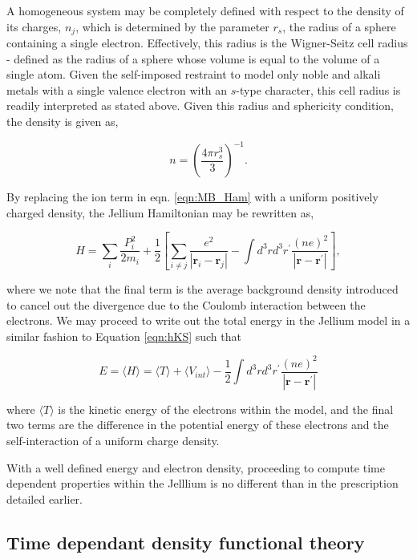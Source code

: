 A homogeneous system may be completely defined with respect to the density of its charges, $n_j$, which is determined by the parameter $r_{s}$, the radius of a sphere containing a single electron. Effectively, this radius is the Wigner-Seitz cell radius - defined as the radius of a sphere whose volume is equal to the volume of a single atom. Given the self-imposed restraint to model only noble and alkali metals with a single valence electron with an $s$-type character, this cell radius is readily interpreted as stated above. Given this radius and sphericity condition, the density is given as,

\begin{equation}
    n = \left( \frac{4\pi r^{3}_{s}}{3} \right)^{-1}.
\end{equation}

By replacing the ion term in eqn. \ref{eqn:MB_Ham} with a uniform positively charged density, the Jellium Hamiltonian may be rewritten as,

\begin{equation}
    H = \sum_{i} \frac{ P_{i}^{2} }{2m_{i}} + \frac{1}{2} \left[ \sum_{i \neq j} \frac{e^{2}}{ |\textbf{r}_{i} - \textbf{r}_{j}| } - \int d^{3}rd^{3}r^{\prime} \frac{(ne)^2}{|\textbf{r} - \textbf{r}^{\prime}|} \right],
    \label{eqn:jlm}
\end{equation}

where we note that the final term is the average background density introduced to cancel out the divergence due to the Coulomb interaction between the electrons. We may proceed to write out the total energy in the Jellium model in a similar fashion to Equation \ref{eqn:hKS} such that 

\begin{equation}
    E = \langle H \rangle = \langle T \rangle + \langle V_{int} \rangle - \frac{1}{2} \int d^{3}rd^{3}r^{\prime} \frac{(ne)^2}{|\textbf{r} - \textbf{r}^{\prime}|}
    \label{eqn:jlm_E}
\end{equation}

where $\langle T \rangle$ is the kinetic energy of the electrons within the model, and the final two terms are the difference in the potential energy of these electrons and the self-interaction of a uniform charge density. 

With a well defined energy and electron density, proceeding to compute time dependent properties within the Jelllium is no different than in the prescription detailed earlier. 

\subsection{Time dependant density functional theory}
\label{sec:RTTDDFT}
